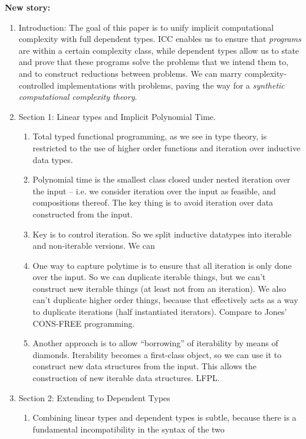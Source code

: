 \documentclass[acmsmall,review]{acmart}
\begin{document}
{\bf New story:}
\begin{enumerate}
\item Introduction: The goal of this paper is to unify implicit
  computational complexity with full dependent types. ICC enables us
  to ensure that \emph{programs} are within a certain complexity
  class, while dependent types allow us to state and prove that these
  programs solve the problems that we intend them to, and to construct
  reductions between problems. We can marry complexity-controlled
  implementations with problems, paving the way for a \emph{synthetic
    computational complexity theory}.
\item Section 1: Linear types and Implicit Polynomial Time.
  \begin{enumerate}
  \item Total typed functional programming, as we see in type theory,
    is restricted to the use of higher order functions and iteration
    over inductive data types.
  \item Polynomial time is the smallest class closed under nested
    iteration over the input -- i.e. we consider iteration over the
    input as feasible, and compositions thereof. The key thing is to
    avoid iteration over data constructed from the input.
  \item Key is to control iteration. So we split inductive datatypes
    into iterable and non-iterable versions. We can
  \item One way to capture polytime is to ensure that all iteration is
    only done over the input. So we can duplicate iterable things, but
    we can't construct new iterable things (at least not from an
    iteration). We also can't duplicate higher order things, because
    that effectively acts as a way to duplicate iterations (half
    instantiated iterators). Compare to Jones' CONS-FREE programming.
  \item Another approach is to allow ``borrowing'' of iterability by
    means of diamonds. Iterability becomes a first-class object, so we
    can use it to construct new data structures from the input. This
    allows the construction of new iterable data structures. LFPL.
  \end{enumerate}
\item Section 2: Extending to Dependent Types
  \begin{enumerate}
  \item Combining linear types and dependent types is subtle, because
    there is a fundamental incompatibility in the syntax of the two

\end{enumerate}
\end{enumerate}
\end{document}

